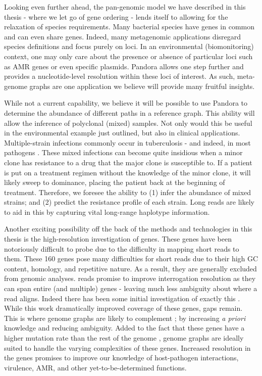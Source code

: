 
Looking even further ahead, the pan-genomic model we have described in this thesis - where we let go of gene ordering - lends itself to allowing for the relaxation of species requirements. Many bacterial species have genes in common and can even share genes. Indeed, many metagenomic applications disregard species definitions and focus purely on loci. In an environmental (biomonitoring) context, one may only care about the presence or absence of particular loci such as AMR genes or even specific plasmids. Pandora allows one step further and provides a nucleotide-level resolution within these loci of interest. As such, meta-genome graphs are one application we believe will provide many fruitful insights.

While not a current capability, we believe it will be possible to use Pandora to determine the abundance of different paths in a reference graph. This ability will allow the inference of polyclonal (mixed) samples. Not only would this be useful in the environmental example just outlined, but also in clinical applications. Multiple-strain infections commonly occur in tuberculosis \cite{Cohen2012} - and indeed, in most pathogens \cite{Balmer2011}. These mixed infections can become quite insidious when a minor clone has resistance to a drug that the major clone is susceptible to. If a patient is put on a treatment regimen without the knowledge of the minor clone, it will likely sweep to dominance, placing the patient back at the beginning of treatment. Therefore, we foresee the ability to (1) infer the abundance of mixed strains; and (2) predict the resistance profile of each strain. Long \ont{} reads are likely to aid in this by capturing vital long-range haplotype information.

Another exciting possibility off the back of the methods and technologies in this thesis is the high-resolution investigation of \ppe{} genes. These genes have been notoriously difficult to probe due to the difficulty in mapping short reads to them. These 160 genes pose many difficulties for short reads due to their high GC content, homology, and repetitive nature. As a result, they are generally excluded from genomic analyses. \ont{} reads promise to improve interrogation resolution as they can span entire (and multiple) \ppe{} genes - leaving much less ambiguity about where a read aligns. Indeed there has been some initial investigation of exactly this \cite{bainomugisa2018}. While this work dramatically improved coverage of these genes, gaps remain. This is where genome graphs are likely to complement \ont{}; by increasing \textit{a priori} knowledge and reducing ambiguity. Added to the fact that these genes have a higher mutation rate than the rest of the genome \cite{bainomugisa2018}, genome graphs are ideally suited to handle the varying complexities of these genes. Increased resolution in the \ppe{} genes promises to improve our knowledge of host-pathogen interactions, virulence, AMR, and other yet-to-be-determined functions.

